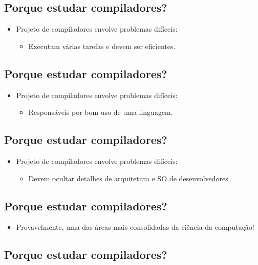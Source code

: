 \documentclass[11pt]{article}
\begin{document}
\subsection*{Porque estudar compiladores?}
\label{sec:org4d329b7}

\begin{itemize}
\item Projeto de compiladores envolve problemas difíceis:
\begin{itemize}
\item Executam várias tarefas e devem ser eficientes.
\end{itemize}
\end{itemize}
\subsection*{Porque estudar compiladores?}
\label{sec:org83629e4}

\begin{itemize}
\item Projeto de compiladores envolve problemas difíceis:
\begin{itemize}
\item Responsáveis por bom uso de uma linguagem.
\end{itemize}
\end{itemize}
\subsection*{Porque estudar compiladores?}
\label{sec:orgce6ce50}

\begin{itemize}
\item Projeto de compiladores envolve problemas difíceis:
\begin{itemize}
\item Devem ocultar detalhes de arquitetura e SO de desenvolvedores.
\end{itemize}
\end{itemize}
\subsection*{Porque estudar compiladores?}
\label{sec:org9d94dd8}

\begin{itemize}
\item Provavelmente, uma das áreas mais consolidadas da ciência da computação!
\end{itemize}
\subsection*{Porque estudar compiladores?}
\label{sec:orgb002745}
\end{document}
